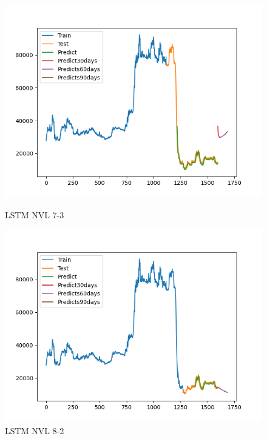 \documentclass[conference]{IEEEtran}
\begin{document}
\begin{figure}[htbp]
    \begin{minipage}{0.23\textwidth}
    \centering
    \includegraphics[width=1\textwidth]{experiment/ltsm/Team4_LSTM_NVL_7_3.png}
    \caption{LSTM NVL 7-3}
    \label{fig:nvl_boxplot}
    \end{minipage}
    \hfill
    \begin{minipage}{0.23\textwidth}
    \centering
    \includegraphics[width=1\textwidth]{experiment/ltsm/Team4_LSTM_NVL_8_2.png}
    \caption{LSTM NVL 8-2}
    \label{fig:nvl_histogram}
    \end{minipage}
    \begin{minipage}{0.23\textwidth}
    \centering

\end{minipage}
\end{figure}
\end{document}
